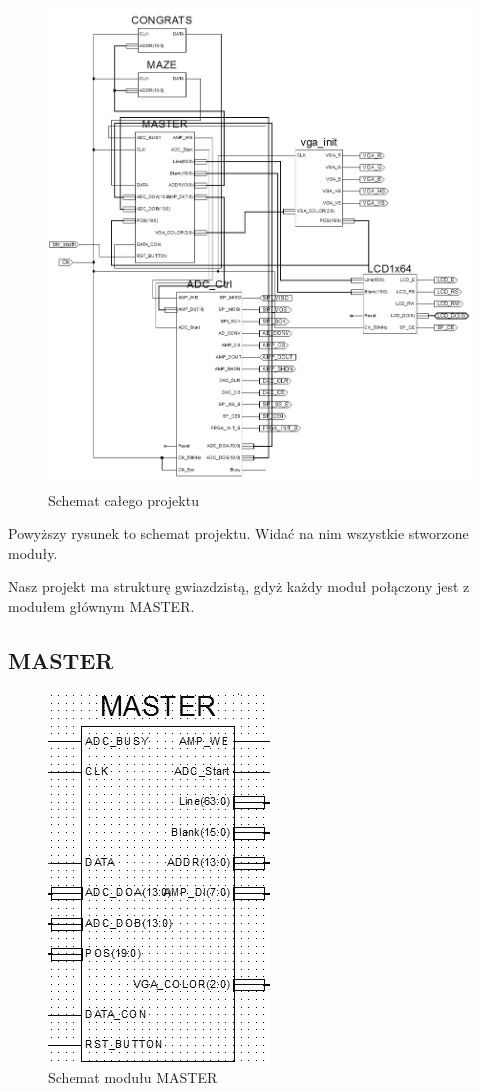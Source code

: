 \documentclass[11pt]{article}
\begin{document}
\begin{figure}[H]
\center
\includegraphics[scale=.6]{schemat.png}
\caption{Schemat całego projektu}
\end{figure}

Powyższy rysunek to schemat projektu.
Widać na nim wszystkie stworzone moduły.

Nasz projekt ma strukturę gwiazdzistą, gdyż każdy moduł połączony jest z modułem głównym MASTER.

\subsection{MASTER}

\begin{figure}[H]
\center
\includegraphics[scale=1]{MASTER.png}
\caption{Schemat modułu MASTER}
\end{figure}
\end{document}
